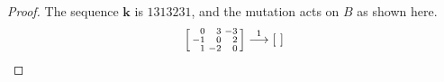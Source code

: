 \documentclass{amsart}
\theoremstyle{definition}
\theoremstyle{remark}
\numberwithin{equation}{section}
\newcommand{\0}{{\mathbf{0}}}
\newcommand{\kk}{\mathbf{k}}
\begin{document}
\begin{proof}
The sequence $\kk$ is $1313231$, and the mutation acts on $B$ as shown here.
\begin{multline*}
\begin{bsmallmatrix*}[r]
0&3&-3\\
-1&0&2\\
1&-2&0
\end{bsmallmatrix*}
\overset{1}{\longrightarrow}
\begin{bsmallmatrix*}[r]

\end{bsmallmatrix*}
\end{multline*}
\end{proof}
\end{document}
